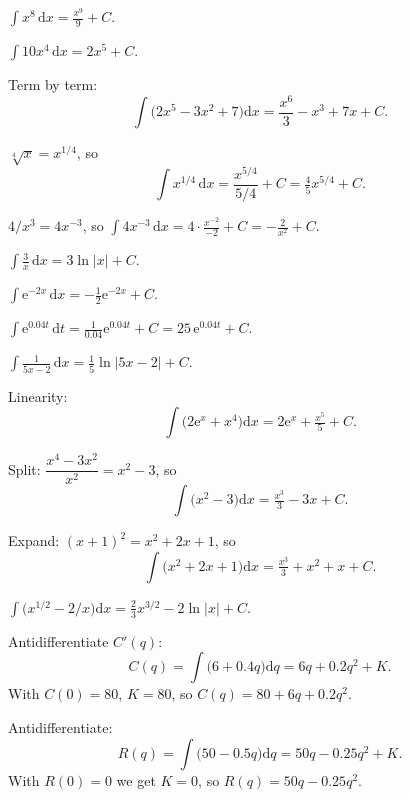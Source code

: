 \begin{solutions}
  \item $\displaystyle\int x^{8}\,\mathrm{d}x=\frac{x^{9}}{9}+C$.

  \item $\displaystyle\int 10x^{4}\,\mathrm{d}x=2x^{5}+C$.

  \item Term by term:
        \[
          \int\bigl(2x^{5}-3x^{2}+7\bigr)\mathrm{d}x
            =\frac{x^{6}}{3}-x^{3}+7x+C .
        \]

  \item $\sqrt[4]{x}=x^{1/4}$, so
        \[
          \int x^{1/4}\,\mathrm{d}x=\frac{x^{5/4}}{5/4}+C
            =\tfrac{4}{5}x^{5/4}+C .
        \]

  \item $4/x^{3}=4x^{-3}$, so
        $\displaystyle\int 4x^{-3}\,\mathrm{d}x
         =4\cdot\frac{x^{-2}}{-2}+C=-\frac{2}{x^{2}}+C$.

  \item $\displaystyle\int \frac{3}{x}\,\mathrm{d}x=3\ln|x|+C$.

  \item $\displaystyle\int \mathrm{e}^{-2x}\,\mathrm{d}x
        =-\tfrac12\mathrm{e}^{-2x}+C$.

  \item $\displaystyle\int \mathrm{e}^{0.04t}\,\mathrm{d}t
        =\frac{1}{0.04}\mathrm{e}^{0.04t}+C=25\,\mathrm{e}^{0.04t}+C$.

  \item $\displaystyle\int \frac{1}{5x-2}\,\mathrm{d}x
        =\tfrac{1}{5}\ln|5x-2|+C$.

  \item Linearity:
        \[
          \int\bigl(2\mathrm{e}^{x}+x^{4}\bigr)\mathrm{d}x
            =2\mathrm{e}^{x}+\tfrac{x^{5}}{5}+C .
        \]

  \item Split: $\dfrac{x^{4}-3x^{2}}{x^{2}}=x^{2}-3$, so
        \[
          \int\bigl(x^{2}-3\bigr)\mathrm{d}x=\tfrac{x^{3}}{3}-3x+C .
        \]

  \item Expand: $(x+1)^{2}=x^{2}+2x+1$, so
        \[
          \int\bigl(x^{2}+2x+1\bigr)\mathrm{d}x
            =\tfrac{x^{3}}{3}+x^{2}+x+C .
        \]

  \item $\displaystyle\int\bigl(x^{1/2}-2/x\bigr)\mathrm{d}x
        =\tfrac{2}{3}x^{3/2}-2\ln|x|+C$.

  \item Antidifferentiate $C'(q)$:
        \[
          C(q)=\int\bigl(6+0.4q\bigr)\mathrm{d}q=6q+0.2q^{2}+K .
        \]
        With $C(0)=80$, $K=80$, so $C(q)=80+6q+0.2q^{2}$.

  \item Antidifferentiate:
        \[
          R(q)=\int\bigl(50-0.5q\bigr)\mathrm{d}q=50q-0.25q^{2}+K .
        \]
        With $R(0)=0$ we get $K=0$, so $R(q)=50q-0.25q^{2}$.
\end{solutions}
